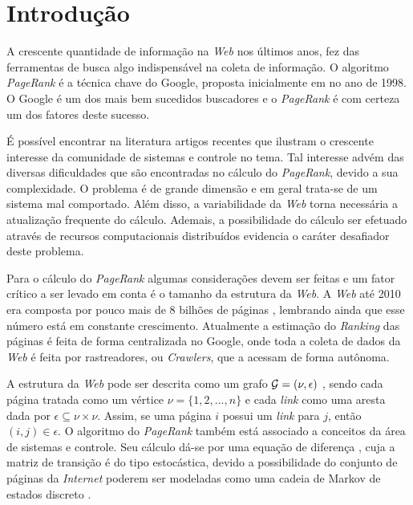 \chapter{Introdução}%

A crescente quantidade de informação na \textit{Web} nos últimos anos, fez das ferramentas de busca algo indispensável na coleta de informação. O algoritmo \textit{PageRank} é a técnica chave do Google, proposta inicialmente em \cite{brin2012reprint} no ano de 1998. O Google é um dos mais bem sucedidos buscadores e o \textit{PageRank} é com certeza um dos fatores deste sucesso.

É possível encontrar na literatura artigos recentes \cite{lei2015distributed,ishii2014pagerank} que ilustram o crescente interesse da comunidade de sistemas e controle no tema. Tal interesse advém das diversas dificuldades que são encontradas no cálculo do \textit{PageRank}, devido a sua complexidade. O problema é de grande dimensão e em geral trata-se de um sistema mal comportado. Além disso, a variabilidade da \textit{Web} torna necessária a atualização frequente do cálculo. Ademais, a possibilidade do cálculo ser efetuado através de recursos computacionais distribuídos \cite{ishiiTAC12} evidencia o caráter desafiador deste problema.

Para o cálculo do \textit{PageRank} algumas considerações devem ser feitas e um fator crítico a ser levado em conta é o tamanho da estrutura da \textit{Web}. A \textit{Web} até 2010 era composta por pouco mais de 8 bilhões de páginas \cite{ishiiTAC10}, lembrando ainda que esse número está em constante crescimento. Atualmente a estimação do \textit{Ranking} das páginas é feita de forma centralizada no Google, onde toda a coleta de dados da \textit{Web} é feita por rastreadores, ou \textit{Crawlers}, que a acessam de forma autônoma.

A estrutura da \textit{Web} pode ser descrita como um grafo ${\cal G} = (\nu,\epsilon)$ \cite{ishiiSCL12}, sendo cada página tratada como um vértice $\nu = \lbrace 1, 2, ..., n \rbrace$ e cada \textit{link} como uma aresta dada por $\epsilon \subseteq \nu \times \nu$. Assim, se uma página $i$ possui um \textit{link} para $j$, então $(i,j) \in \epsilon$. O algoritmo do \textit{PageRank} também está associado a conceitos da área de sistemas e controle. Seu cálculo dá-se por uma equação de diferença \cite{pagerankSIREV}, cuja a matriz de transição é do tipo estocástica, devido a possibilidade do conjunto de páginas da \textit{Internet} poderem ser modeladas como uma cadeia de Markov de estados discreto \cite{costafragosomarques}. 


